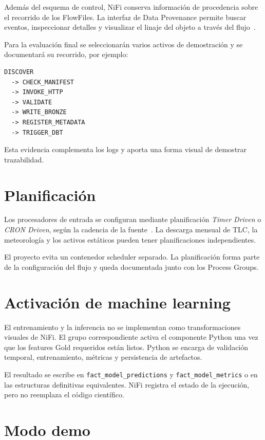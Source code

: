 Además del esquema de control, NiFi conserva información de procedencia sobre el recorrido de los FlowFiles. La interfaz de Data Provenance permite buscar eventos, inspeccionar detalles y visualizar el linaje del objeto a través del flujo~\cite{nifi_user_guide}.

Para la evaluación final se seleccionarán varios activos de demostración y se documentará su recorrido, por ejemplo:

\begin{lstlisting}[caption={Recorrido conceptual de un activo TLC en NiFi.}]
DISCOVER
  -> CHECK_MANIFEST
  -> INVOKE_HTTP
  -> VALIDATE
  -> WRITE_BRONZE
  -> REGISTER_METADATA
  -> TRIGGER_DBT
\end{lstlisting}

Esta evidencia complementa los logs y aporta una forma visual de demostrar trazabilidad.

\section{Planificación}

Los procesadores de entrada se configuran mediante planificación \textit{Timer Driven} o \textit{CRON Driven}, según la cadencia de la fuente~\cite{nifi_user_guide}. La descarga mensual de TLC, la meteorología y los activos estáticos pueden tener planificaciones independientes.

El proyecto evita un contenedor scheduler separado. La planificación forma parte de la configuración del flujo y queda documentada junto con los Process Groups.

\section{Activación de machine learning}

El entrenamiento y la inferencia no se implementan como transformaciones visuales de NiFi. El grupo correspondiente activa el componente Python una vez que los features Gold requeridos están listos. Python se encarga de validación temporal, entrenamiento, métricas y persistencia de artefactos.

El resultado se escribe en \texttt{fact\_model\_predictions} y \texttt{fact\_model\_metrics} o en las estructuras definitivas equivalentes. NiFi registra el estado de la ejecución, pero no reemplaza el código científico.

\section{Modo demo}

